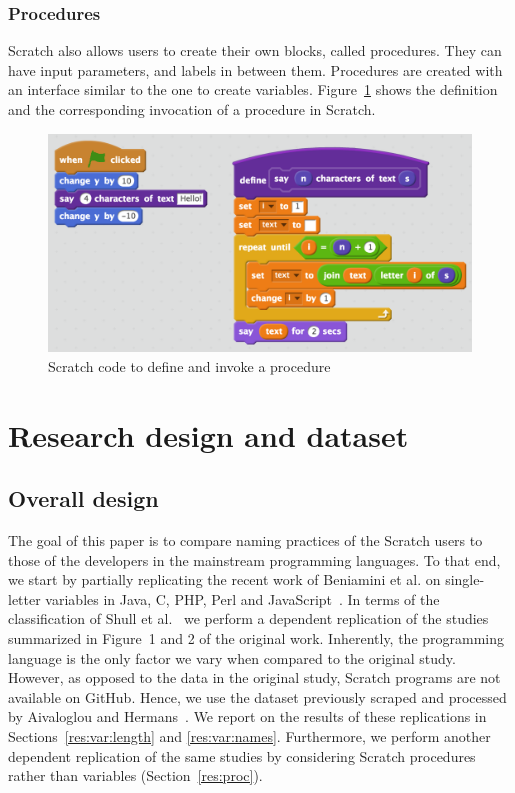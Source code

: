 \documentclass[conference]{IEEEtran}
\begin{document}
\subsubsection{Procedures} \label {sec:Scratch_func}
Scratch also allows users to create their own blocks, called procedures. They can have input parameters, and labels in between them. Procedures are created with an interface similar to the one to create variables. Figure~\ref{fig:procedures} shows the definition and the corresponding invocation of a procedure in Scratch.

\begin{figure}
  \begin{center}
  \includegraphics[width=\columnwidth]{fig/procedures2.png}
  \caption{Scratch code to define and invoke a procedure}
  \label{fig:procedures}
  \end{center}
\end{figure} 


\section{Research design and dataset}
\subsection{Overall design}
\label{sec:design}
The goal of this paper is to compare naming practices of the Scratch users to those of the developers in the mainstream programming languages. To that end, we start by partially replicating the recent work of Beniamini et al. on single-letter variables in Java, C, PHP, Perl and JavaScript~\cite{Beniamini}. 
In terms of the classification of Shull et al.~\cite{Shull2008} we perform a dependent replication of the studies summarized in Figure~1 and 2 of the original work.  
Inherently, the programming language is the only factor we vary when compared to the original study. 
However, as opposed to the data in the original study, Scratch programs are not available on GitHub. 
Hence, we use the dataset previously scraped and processed by Aivaloglou and Hermans~\cite{Aivaloglou2016HowKC}. 
We report on the results of these replications in Sections~\ref{res:var:length} and \ref{res:var:names}.
%
Furthermore, we perform another dependent replication of the same studies by considering Scratch procedures rather than variables (Section~\ref{res:proc}).
\end{document}
